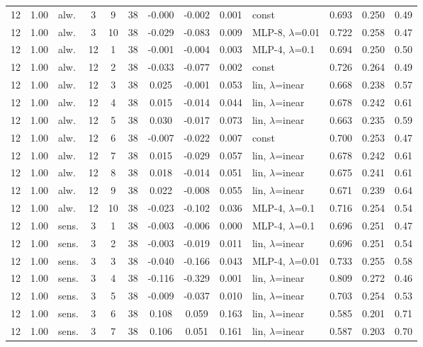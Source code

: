 \begin{scriptsize}
\begin{longtable}{cclcc c ccc l ccc}
12 & 1.00 & alw. & 3 & 9 & 38 & -0.000 & -0.002 & 0.001 & const & 0.693 & 0.250 & 0.49 \\
12 & 1.00 & alw. & 3 & 10 & 38 & -0.029 & -0.083 & 0.009 & MLP-8, $\lambda$=0.01 & 0.722 & 0.258 & 0.47 \\
12 & 1.00 & alw. & 12 & 1 & 38 & -0.001 & -0.004 & 0.003 & MLP-4, $\lambda$=0.1 & 0.694 & 0.250 & 0.50 \\
12 & 1.00 & alw. & 12 & 2 & 38 & -0.033 & -0.077 & 0.002 & const & 0.726 & 0.264 & 0.49 \\
12 & 1.00 & alw. & 12 & 3 & 38 & 0.025 & -0.001 & 0.053 & lin, $\lambda$=inear & 0.668 & 0.238 & 0.57 \\
12 & 1.00 & alw. & 12 & 4 & 38 & 0.015 & -0.014 & 0.044 & lin, $\lambda$=inear & 0.678 & 0.242 & 0.61 \\
12 & 1.00 & alw. & 12 & 5 & 38 & 0.030 & -0.017 & 0.073 & lin, $\lambda$=inear & 0.663 & 0.235 & 0.59 \\
12 & 1.00 & alw. & 12 & 6 & 38 & -0.007 & -0.022 & 0.007 & const & 0.700 & 0.253 & 0.47 \\
12 & 1.00 & alw. & 12 & 7 & 38 & 0.015 & -0.029 & 0.057 & lin, $\lambda$=inear & 0.678 & 0.242 & 0.61 \\
12 & 1.00 & alw. & 12 & 8 & 38 & 0.018 & -0.014 & 0.051 & lin, $\lambda$=inear & 0.675 & 0.241 & 0.61 \\
12 & 1.00 & alw. & 12 & 9 & 38 & 0.022 & -0.008 & 0.055 & lin, $\lambda$=inear & 0.671 & 0.239 & 0.64 \\
12 & 1.00 & alw. & 12 & 10 & 38 & -0.023 & -0.102 & 0.036 & MLP-4, $\lambda$=0.1 & 0.716 & 0.254 & 0.54 \\
12 & 1.00 & sens. & 3 & 1 & 38 & -0.003 & -0.006 & 0.000 & MLP-4, $\lambda$=0.1 & 0.696 & 0.251 & 0.47 \\
12 & 1.00 & sens. & 3 & 2 & 38 & -0.003 & -0.019 & 0.011 & lin, $\lambda$=inear & 0.696 & 0.251 & 0.54 \\
12 & 1.00 & sens. & 3 & 3 & 38 & -0.040 & -0.166 & 0.043 & MLP-4, $\lambda$=0.01 & 0.733 & 0.255 & 0.58 \\
12 & 1.00 & sens. & 3 & 4 & 38 & -0.116 & -0.329 & 0.001 & lin, $\lambda$=inear & 0.809 & 0.272 & 0.46 \\
12 & 1.00 & sens. & 3 & 5 & 38 & -0.009 & -0.037 & 0.010 & lin, $\lambda$=inear & 0.703 & 0.254 & 0.53 \\
12 & 1.00 & sens. & 3 & 6 & 38 & 0.108 & 0.059 & 0.163 & lin, $\lambda$=inear & 0.585 & 0.201 & 0.71 \\
12 & 1.00 & sens. & 3 & 7 & 38 & 0.106 & 0.051 & 0.161 & lin, $\lambda$=inear & 0.587 & 0.203 & 0.70 \\

\end{longtable}
\end{scriptsize}
